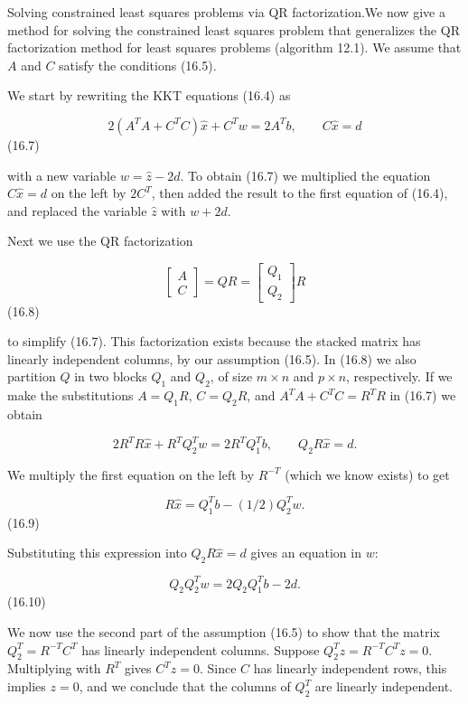 Solving constrained least squares problems via QR factorization.We now give a method for solving the constrained least squares problem that generalizes the QR factorization method for least squares problems (algorithm 12.1). We assume that \(A\) and \(C\) satisfy the conditions (16.5).

We start by rewriting the KKT equations (16.4) as

\[2(A^{T}A+C^{T}C)\hat{x}+C^{T}w=2A^{T}b,\qquad C\hat{x}=d\] (16.7)

with a new variable \(w=\hat{z}-2d\). To obtain (16.7) we multiplied the equation \(C\hat{x}=d\) on the left by \(2C^{T}\), then added the result to the first equation of (16.4), and replaced the variable \(\hat{z}\) with \(w+2d\).

Next we use the QR factorization

\[\left[\begin{array}{c}A\\ C\end{array}\right]=QR=\left[\begin{array}{c}Q_{1}\\ Q_{2}\end{array}\right]R\] (16.8)

to simplify (16.7). This factorization exists because the stacked matrix has linearly independent columns, by our assumption (16.5). In (16.8) we also partition \(Q\) in two blocks \(Q_{1}\) and \(Q_{2}\), of size \(m\times n\) and \(p\times n\), respectively. If we make the substitutions \(A=Q_{1}R\), \(C=Q_{2}R\), and \(A^{T}A+C^{T}C=R^{T}R\) in (16.7) we obtain

\[2R^{T}R\hat{x}+R^{T}Q_{2}^{T}w=2R^{T}Q_{1}^{T}b,\qquad Q_{2}R\hat{x}=d.\]

We multiply the first equation on the left by \(R^{-T}\) (which we know exists) to get

\[R\hat{x}=Q_{1}^{T}b-(1/2)Q_{2}^{T}w.\] (16.9)

Substituting this expression into \(Q_{2}R\hat{x}=d\) gives an equation in \(w\):

\[Q_{2}Q_{2}^{T}w=2Q_{2}Q_{1}^{T}b-2d.\] (16.10)

We now use the second part of the assumption (16.5) to show that the matrix \(Q_{2}^{T}=R^{-T}C^{T}\) has linearly independent columns. Suppose \(Q_{2}^{T}z=R^{-T}C^{T}z=0\). Multiplying with \(R^{T}\) gives \(C^{T}z=0\). Since \(C\) has linearly independent rows, this implies \(z=0\), and we conclude that the columns of \(Q_{2}^{T}\) are linearly independent.

